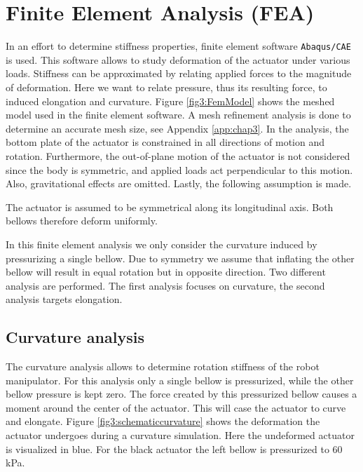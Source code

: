 
\section{Finite Element Analysis (FEA)}

In an effort to determine stiffness properties, finite element software \verb+Abaqus/CAE+ is used. This software allows to study deformation of the actuator under various loads. Stiffness can be approximated by relating applied forces to the magnitude of deformation. Here we want to relate pressure, thus its resulting force, to induced elongation and curvature. Figure  \ref{fig3:FemModel} shows the meshed model used in the finite element software. A mesh refinement analysis is done to determine an accurate mesh size, see Appendix \ref{app:chap3}. In the analysis, the bottom plate of the actuator is constrained in all directions of motion and rotation. Furthermore, the out-of-plane motion of the actuator is not considered since the body is symmetric, and applied loads act perpendicular to this motion. Also, gravitational effects are omitted. Lastly, the following assumption is made. 

\begin{theorem}
The actuator is assumed to be symmetrical along its longitudinal axis. Both bellows therefore deform uniformly.
\end{theorem}


In this finite element analysis we only consider the curvature induced by pressurizing a single bellow. Due to symmetry we assume that inflating the other bellow will result in equal rotation but in opposite direction. Two different analysis are performed. The first analysis focuses on curvature, the second analysis targets elongation. 


\subsection{Curvature analysis}

The curvature analysis allows to determine rotation stiffness of the robot manipulator. For this analysis only a single bellow is pressurized, while the other bellow pressure is kept zero. The force created by this pressurized bellow causes a moment around the center of the actuator. This will case the actuator to curve and elongate. Figure \ref{fig3:schematiccurvature} shows the deformation the actuator undergoes during a curvature simulation. Here the undeformed actuator is visualized in blue. For the black actuator the left bellow is pressurized to 60 kPa.


